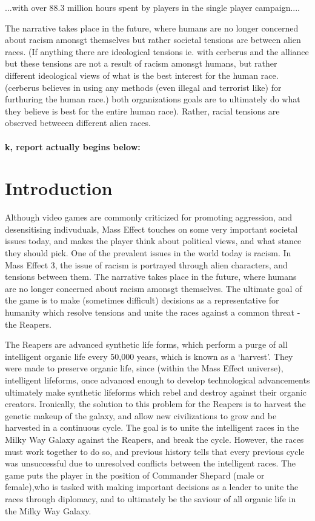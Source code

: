 \documentclass[journal]{IEEEtran}
\begin{document}
...with over 88.3 million hours spent by players in the single player campaign.\cite{ea}...


The narrative takes place in the future, where humans are no longer concerned about racism amonsgt themselves but rather societal
tensions are between alien races. (If anything there are ideological tensions ie. with cerberus and the alliance but these
tensions are not a result of racism amonsgt humans, but rather different ideological views of what is the best interest for the human race. (cerberus believes in using any methods (even illegal and terrorist like) for furthuring the human race.)
both organizations goals are to ultimately do what they believe is best for the entire human race). Rather, racial tensions are observed betweeen different alien races.
\\ \\ \LARGE{\textbf{k, report actually begins below:}}
\normalsize
\section{Introduction}
Although video games are commonly criticized for promoting aggression, and desensitising indivuduals, Mass Effect touches on some very important societal issues today, and makes the player think about political views,
and what stance they should pick. One of the prevalent issues in the world today is racism. In Mass Effect 3, the issue of racism is portrayed through alien characters, and tensions between them. The narrative takes place in the future, where humans are no longer concerned about racism amonsgt themselves. The ultimate goal of the game is to make (sometimes difficult) decisions as a representative for humanity which resolve tensions and unite the races against a common threat -the Reapers.

The Reapers are advanced synthetic life forms, which perform a purge of all intelligent organic life every 50,000 years, which is known as a `harvest'. They were made to preserve organic life, since
(within the Mass Effect universe), intelligent lifeforms, once advanced
enough to develop technological advancements ultimately make synthetic
lifeforms which rebel and destroy against their organic creators. Ironically,
the solution to this problem for the Reapers is to harvest the genetic makeup
of the galaxy, and allow new civilizations to grow and be harvested in a continuous cycle. The goal is to unite the intelligent
races in the Milky Way Galaxy against the Reapers, and break the cycle.
However, the races must work together to do so,
and previous history tells that every previous cycle was
unsuccessful due to unresolved conflicts between the intelligent races. The game puts the player in the position of Commander Shepard (male or female),who is tasked with making important decisions as a leader to unite the races through diplomacy, and to ultimately be the saviour of all organic life in the Milky Way Galaxy.
\end{document}

